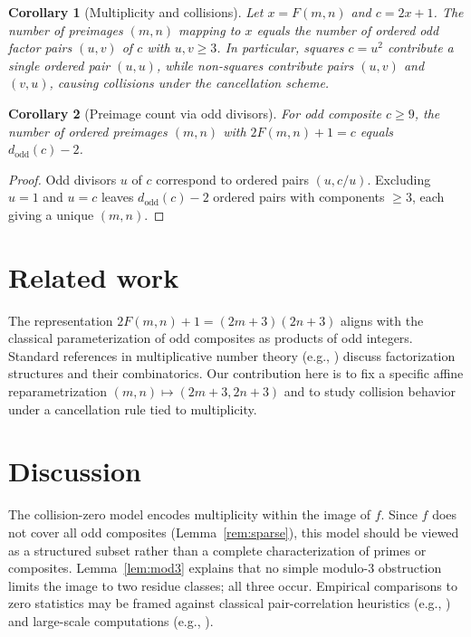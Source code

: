 \documentclass[12pt,a4paper]{article}
\newtheorem{corollary}{Corollary}[section]
\begin{document}
\begin{corollary}[Multiplicity and collisions]\label{cor:mult}
Let \(x=F(m,n)\) and \(c=2x+1\). The number of preimages \((m,n)\) mapping to \(x\) equals the number of ordered odd factor pairs \((u,v)\) of \(c\) with \(u,v\ge 3\). In particular, squares \(c=u^2\) contribute a single ordered pair \((u,u)\), while non-squares contribute pairs \((u,v)\) and \((v,u)\), causing collisions under the cancellation scheme.
\end{corollary}

\begin{corollary}[Preimage count via odd divisors]\label{cor:odddiv}
For odd composite \(c\ge 9\), the number of ordered preimages \((m,n)\) with \(2F(m,n)+1=c\) equals \(d_{\mathrm{odd}}(c) - 2\).
\end{corollary}
\begin{proof}
Odd divisors \(u\) of \(c\) correspond to ordered pairs \((u, c/u)\). Excluding \(u=1\) and \(u=c\) leaves \(d_{\mathrm{odd}}(c)-2\) ordered pairs with components \(\ge 3\), each giving a unique \((m,n)\).
\end{proof}

\section{Related work}
The representation \(2F(m,n)+1=(2m+3)(2n+3)\) aligns with the classical parameterization of odd composites as products of odd integers. Standard references in multiplicative number theory (e.g., \cite{hardywright2008, montgomery2007}) discuss factorization structures and their combinatorics. Our contribution here is to fix a specific affine reparametrization \((m,n)\mapsto (2m+3,2n+3)\) and to study collision behavior under a cancellation rule tied to multiplicity.

\section{Discussion}
The collision-zero model encodes multiplicity within the image of \(f\). Since \(f\) does not cover all odd composites (Lemma~\ref{rem:sparse}), this model should be viewed as a structured subset rather than a complete characterization of primes or composites. Lemma~\ref{lem:mod3} explains that no simple modulo-3 obstruction limits the image to two residue classes; all three occur. Empirical comparisons to zero statistics may be framed against classical pair-correlation heuristics (e.g., \cite{montgomery1973}) and large-scale computations (e.g., \cite{odlyzko1987}).
\end{document}
